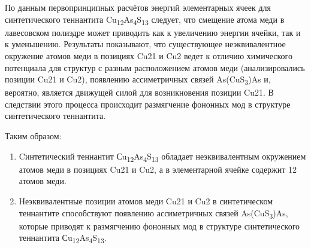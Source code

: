 По данным первопринципных расчётов энергий элементарных ячеек для синтетического теннантита Cu\textsubscript{12}As\textsubscript{4}S\textsubscript{13} следует,  что смещение атома меди в лавесовском полиэдре может приводить как к увеличению энергии ячейки, так и к уменьшению.
Результаты показывают, что существующее неэквивалентное  окружение атомов меди в позициях Cu21 и Cu2 ведет к отличию химического потенциала для структур с разным расположением атомов меди (анализировались позиции Cu21 и Cu2), появлению ассиметричных связей As(CuS\textsubscript{3})As и, вероятно, является движущей силой для возникновения позиции Cu21. В следствии этого процесса происходит размягчение фононных мод в структуре синтетического теннантита.

Таким образом:
\begin{enumerate}
  \item Cинтетический теннантит Сu\textsubscript{12}As\textsubscript{4}S\textsubscript{13} обладает неэквивалентным  окружением атомов меди в позициях Cu21 и Cu2, а в элементарной ячейке содержит 12 атомов меди.
  \item Неэквивалентные позиции атомов меди Cu21 и Cu2 в синтетическом теннантите способствуют появлению ассиметричных связей As(CuS\textsubscript{3})As, которые приводят к размягчению фононных мод в структуре синтетического теннантита Сu\textsubscript{12}As\textsubscript{4}S\textsubscript{13}.
\end{enumerate}
% 
% 
% 
% 

\newpage
